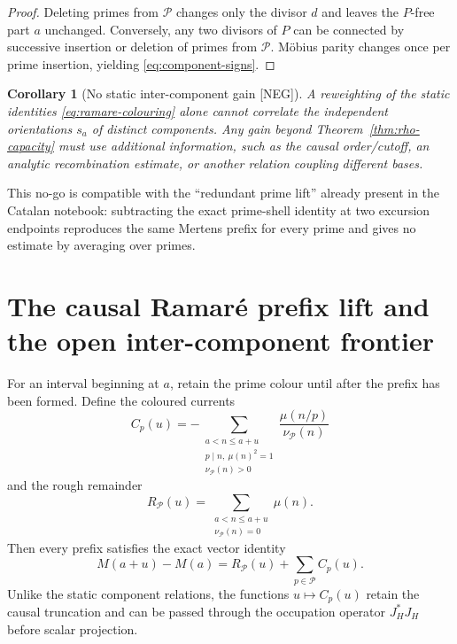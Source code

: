 \documentclass[11pt]{amsart}
\numberwithin{equation}{section}
\theoremstyle{plain}
\newtheorem{corollary}[theorem]{Corollary}
\theoremstyle{definition}
\theoremstyle{remark}
\newcommand{\Mert}{M}
\newcommand{\Mob}{\mu}
\newcommand{\NEG}{\textup{[NEG]}}
\begin{document}
\begin{proof}
Deleting primes from $\mathcal P$ changes only the divisor $d$ and leaves the $P$-free part $a$ unchanged.  Conversely,
any two divisors of $P$ can be connected by successive insertion or deletion of primes from $\mathcal P$.  M\"obius parity
changes once per prime insertion, yielding \eqref{eq:component-signs}.
\end{proof}

\begin{corollary}[No static inter-component gain \NEG]
\label{cor:no-static-intercomponent}
A reweighting of the static identities \eqref{eq:ramare-colouring} alone cannot correlate the independent orientations
$s_a$ of distinct components.  Any gain beyond Theorem~\ref{thm:rho-capacity} must use additional information, such as the
causal order/cutoff, an analytic recombination estimate, or another relation coupling different bases.
\end{corollary}

This no-go is compatible with the ``redundant prime lift'' already present in the Catalan notebook: subtracting the exact
prime-shell identity at two excursion endpoints reproduces the same Mertens prefix for every prime and gives no estimate by
averaging over primes.

\section{The causal Ramar\'e prefix lift and the open inter-component frontier}
\label{sec:causal-ramare}

For an interval beginning at $a$, retain the prime colour until after the prefix has been formed.  Define the coloured currents
\begin{equation}
C_p(u)
=
-\sum_{\substack{a<n\le a+u\\p\mid n,\ \Mob(n)^2=1\\\nu_{\mathcal P}(n)>0}}
\frac{\Mob(n/p)}{\nu_{\mathcal P}(n)}
\label{eq:coloured-current}
\end{equation}
and the rough remainder
\begin{equation}
R_{\mathcal P}(u)
=
\sum_{\substack{a<n\le a+u\\\nu_{\mathcal P}(n)=0}}\Mob(n).
\label{eq:rough-current}
\end{equation}
Then every prefix satisfies the exact vector identity
\begin{equation}
\boxed{
\Mert(a+u)-\Mert(a)
=
R_{\mathcal P}(u)+\sum_{p\in\mathcal P}C_p(u).}
\label{eq:ramare-prefix-vector}
\end{equation}
Unlike the static component relations, the functions $u\mapsto C_p(u)$ retain the causal truncation and can be passed through
the occupation operator $J_H^*J_H$ before scalar projection.
\end{document}
